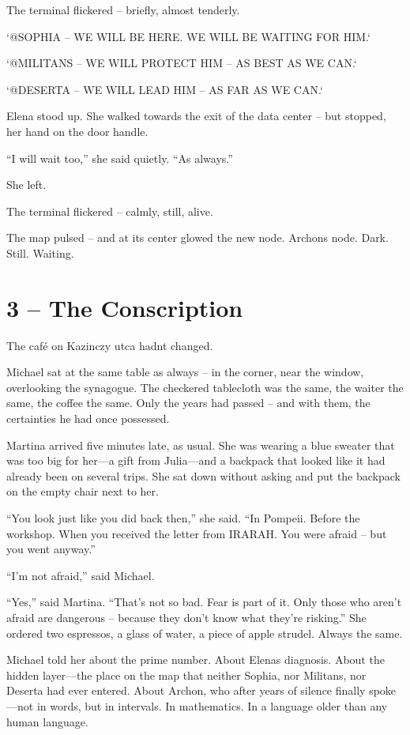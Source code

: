 \documentclass[
]{article}
\begin{document}
The terminal flickered -- briefly, almost tenderly.

`@SOPHIA -- WE WILL BE HERE. WE WILL BE WAITING FOR HIM.`

`@MILITANS -- WE WILL PROTECT HIM -- AS BEST AS WE CAN.`

`@DESERTA -- WE WILL LEAD HIM -- AS FAR AS WE CAN.`

Elena stood up. She walked towards the exit of the data center -- but stopped, her hand on the door handle.

``I will wait too,'' she said quietly. ``As always.''

She left.

The terminal flickered -- calmly, still, alive.

The map pulsed -- and at its center glowed the new node. Archon\textquotesingle s node. Dark. Still. Waiting.

\section{3 -- The Conscription}\label{the-conscription}

The café on Kazinczy utca hadn\textquotesingle t changed.

Michael sat at the same table as always -- in the corner, near the window, overlooking the synagogue. The checkered tablecloth was the same, the waiter the same, the coffee the same. Only the years had passed -- and with them, the certainties he had once possessed.

Martina arrived five minutes late, as usual. She was wearing a blue sweater that was too big for her---a gift from Julia---and a backpack that looked like it had already been on several trips. She sat down without asking and put the backpack on the empty chair next to her.

``You look just like you did back then,'' she said. ``In Pompeii. Before the workshop. When you received the letter from IRARAH. You were afraid -- but you went anyway.''

``I'm not afraid,'' said Michael.

``Yes,'' said Martina. ``That's not so bad. Fear is part of it. Only those who aren't afraid are dangerous -- because they don't know what they're risking.'' She ordered two espressos, a glass of water, a piece of apple strudel. Always the same.

Michael told her about the prime number. About Elena\textquotesingle s diagnosis. About the hidden layer---the place on the map that neither Sophia, nor Militans, nor Deserta had ever entered. About Archon, who after years of silence finally spoke---not in words, but in intervals. In mathematics. In a language older than any human language.
\end{document}
